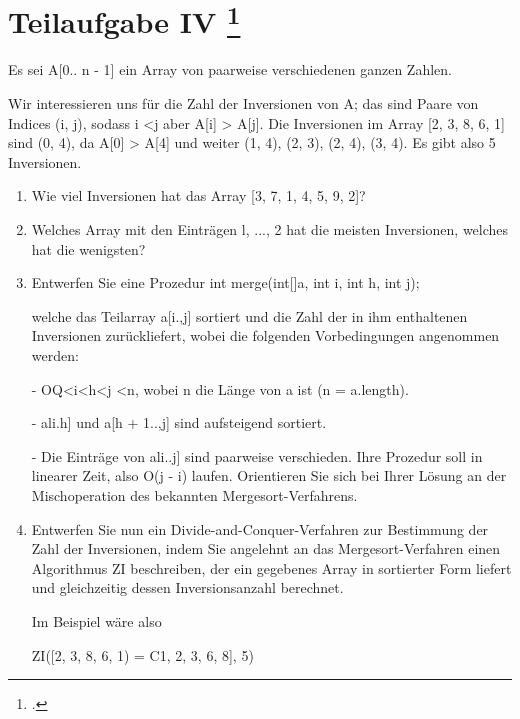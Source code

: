 \documentclass{lehramt-informatik-aufgabe}
\begin{document}
\liAufgabenTitel{}
\section{Teilaufgabe IV
\footcite{66115:2016:09}}

Es sei A[0.. n - 1] ein Array von paarweise verschiedenen ganzen Zahlen.

Wir interessieren uns für die Zahl der Inversionen von A; das sind Paare von Indices (i, j), sodass i <j
aber A[i] > A[j]. Die Inversionen im Array [2, 3, 8, 6, 1] sind (0, 4), da A[0] > A[4] und weiter (1, 4),
(2, 3), (2, 4), (3, 4). Es gibt also 5 Inversionen.
\begin{enumerate}


\item Wie viel Inversionen hat das Array [3, 7, 1, 4, 5, 9, 2]?


\item Welches Array mit den Einträgen {l, ..., 2} hat die meisten Inversionen, welches hat die
wenigsten?


\item Entwerfen Sie eine Prozedur
int merge(int[]a, int i, int h, int j);

welche das Teilarray a[i.,j] sortiert und die Zahl der in ihm enthaltenen Inversionen zurückliefert,
wobei die folgenden Vorbedingungen angenommen werden:

- OQ<i<h<j <n, wobei n die Länge von a ist (n = a.length).

- ali.h] und a[h + 1..,j] sind aufsteigend sortiert.

- Die Einträge von ali..j] sind paarweise verschieden.
Ihre Prozedur soll in linearer Zeit, also O(j - i) laufen.
Orientieren Sie sich bei Ihrer Lösung an der Mischoperation des bekannten Mergesort-Verfahrens.


\item Entwerfen Sie nun ein Divide-and-Conquer-Verfahren zur Bestimmung der Zahl der Inversionen,
indem Sie angelehnt an das Mergesort-Verfahren einen Algorithmus ZI beschreiben, der ein
gegebenes Array in sortierter Form liefert und gleichzeitig dessen Inversionsanzahl berechnet.

Im Beispiel wäre also

ZI([2, 3, 8, 6, 1) = C1, 2, 3, 6, 8], 5)


\end{enumerate}
\end{document}
